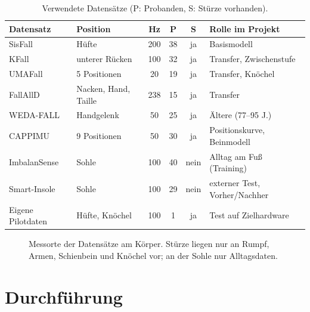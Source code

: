 \documentclass[11pt,a4paper,oneside,parskip=half,open=any,
               numbers=noenddot,listof=totoc,bibliography=totoc]{scrreprt}
\begin{document}
\begin{table}[H]
\centering\footnotesize
\setlength{\tabcolsep}{3.5pt}
\caption{Verwendete Datensätze (P: Probanden, S: Stürze vorhanden).}
\label{tab:daten}
\begin{tabularx}{\textwidth}{l l c c c Y}
\toprule
\textbf{Datensatz} & \textbf{Position} & \textbf{Hz} & \textbf{P} & \textbf{S} & \textbf{Rolle im Projekt} \\
\midrule
SisFall \cite{sucerquia2017sisfall}   & Hüfte                 & 200 & 38 & ja   & Basismodell \\
KFall \cite{kfall2021}                & unterer Rücken        & 100 & 32 & ja   & Transfer, Zwischenstufe \\
UMAFall \cite{umafall2017}            & 5 Positionen          & 20  & 19 & ja   & Transfer, Knöchel \\
FallAllD \cite{fallalld2020}          & Nacken, Hand, Taille  & 238 & 15 & ja   & Transfer \\
WEDA-FALL \cite{wedafall2023}         & Handgelenk            & 50  & 25 & ja   & Ältere (77--95 J.) \\
CAPPIMU \cite{cappimu2024}            & 9 Positionen          & 50  & 30 & ja   & Positionskurve, Beinmodell \\
ImbalanSense \cite{imbalansense2026}  & Sohle                 & 100 & 40 & nein & Alltag am Fuß (Training) \\
Smart-Insole \cite{smartinsole2021}   & Sohle                 & 100 & 29 & nein & externer Test, Vorher/Nachher \\
Eigene Pilotdaten                     & Hüfte, Knöchel        & 100 & 1  & ja   & Test auf Zielhardware \\
\bottomrule
\end{tabularx}
\end{table}

\begin{figure}[H]
\centering
\resizebox{0.86\textwidth}{!}{}
\caption{Messorte der Datensätze am Körper. Stürze liegen nur an Rumpf,
Armen, Schienbein und Knöchel vor; an der Sohle nur Alltagsdaten.}
\label{fig:koerper}
\end{figure}

\chapter{Durchführung}
\label{ch:durchfuehrung}
\end{document}
